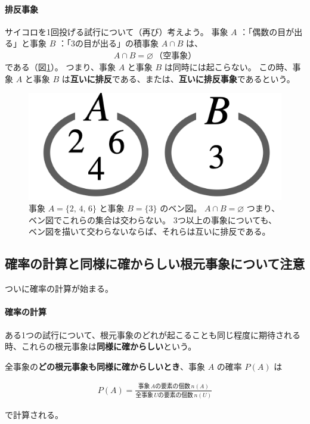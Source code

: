 \documentclass[12pt]{ltjsarticle}\usepackage{ifthen}\newcounter{enlarge}\setcounter{enlarge}{1}
\begin{document}
\paragraph{排反事象}

サイコロを1回投げる試行について（再び）考えよう。
事象 $A$ ：「偶数の目が出る」と事象 $B$ ：「3の目が出る」の積事象 $A \cap B$ は、
\begin{align}
  A \cap B = \varnothing\, \text{（空事象）} \label{eq:1.7}
\end{align}
である（図\ref{f:1.2}）。
つまり、事象 $A$ と事象 $B$ は同時には起こらない。
この時、事象 $A$ と事象 $B$ は\textbf{互いに排反}である、または、\textbf{互いに排反事象}であるという。

\begin{figure}[] 
\centering 
\includegraphics[width=6truecm]{./figure/f1-2.png}
\captionsetup{width=.9\linewidth}
\caption{%
  事象 $A = \{2,\, 4,\, 6\}$ と事象 $B = \{3\}$ のベン図。
  $A \cap B = \varnothing$ つまり、ベン図でこれらの集合は交わらない。
  3つ以上の事象についても、ベン図を描いて交わらないならば、それらは互いに排反である。
}
\label{f:1.2}
\end{figure}

\subsection{確率の計算と同様に確からしい根元事象について注意}

ついに確率の計算が始まる。

\paragraph{確率の計算}

ある1つの試行について、根元事象のどれが起こることも同じ程度に期待される時、これらの根元事象は\textbf{同様に確からしい}という。

全事象の\textbf{どの根元事象も同様に確からしいとき}、事象 $A$ の確率 $P(A)$ は
\begin{oframed}
  \begin{align}
    P(A) = \frac{\text{事象}\, A \text{の要素の個数}\, n(A)}{\text{全事象}\, U \text{の要素の個数}\, n(U)} \label{eq:1.8}
  \end{align}
\end{oframed}
\noindent
で計算される。
\end{document}
